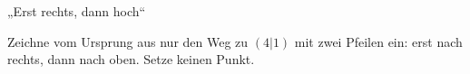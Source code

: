 \setcounter{aufgabe}{9}

\begin{aufgabe}{„Erst rechts, dann hoch“}
\begin{teile}
\teil Zeichne vom Ursprung aus nur den Weg zu $(4|1)$ mit zwei Pfeilen ein: erst nach rechts, dann nach oben. Setze keinen Punkt.

\begin{ksys}[xmin=0,xmax=7,ymin=0,ymax=7] \end{ksys}
\end{teile}
\end{aufgabe}

